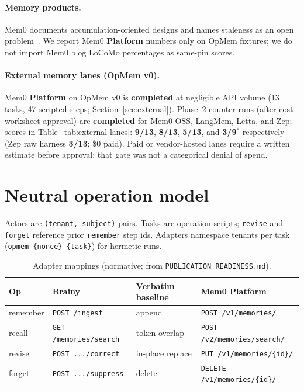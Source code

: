 \documentclass[11pt]{article}
\begin{document}
\paragraph{Memory products.}
Mem0 documents accumulation-oriented designs and names staleness as an open problem~\cite{mem0state2026}.
We report Mem0 \textbf{Platform} numbers only on OpMem fixtures; we do not import Mem0 blog
LoCoMo percentages as same-pin scores.

\paragraph{External memory lanes (OpMem v0).}
Mem0 \textbf{Platform} on OpMem v0 is \textbf{completed} at negligible API volume (13 tasks, 47 scripted steps; Section~\ref{sec:external}).
Phase~2 counter-runs (after cost worksheet approval) are \textbf{completed} for Mem0 OSS, LangMem, Letta, and Zep; scores in Table~\ref{tab:external-lanes}: \textbf{9/13}, \textbf{8/13}, \textbf{5/13}, and \textbf{3/9$^{*}$} respectively (Zep raw harness \textbf{3/13}; \$0 paid).
Paid or vendor-hosted lanes require a written estimate before approval; that gate was not a categorical denial of spend.

\section{Neutral operation model}
\label{sec:model}
Actors are \texttt{(tenant, subject)} pairs.
Tasks are operation scripts; \texttt{revise} and \texttt{forget} reference prior
\texttt{remember} step ids.
Adapters namespace tenants per task (\texttt{opmem-\{nonce\}-\{task\}}) for hermetic runs.

\begin{table}[h]
\centering
\caption{Adapter mappings (normative; from \texttt{PUBLICATION\_READINESS.md}).}
\begin{tabular}{llll}
\toprule
Op & Brainy & Verbatim baseline & Mem0 Platform \\
\midrule
remember & \texttt{POST /ingest} & append & \texttt{POST /v1/memories/} \\
recall & \texttt{GET /memories/search} & token overlap & \texttt{POST /v2/memories/search/} \\
revise & \texttt{POST .../correct} & in-place replace & \texttt{PUT /v1/memories/\{id\}/} \\
forget & \texttt{POST .../suppress} & delete & \texttt{DELETE /v1/memories/\{id\}/} \\
\bottomrule
\end{tabular}
\end{table}
\end{document}

